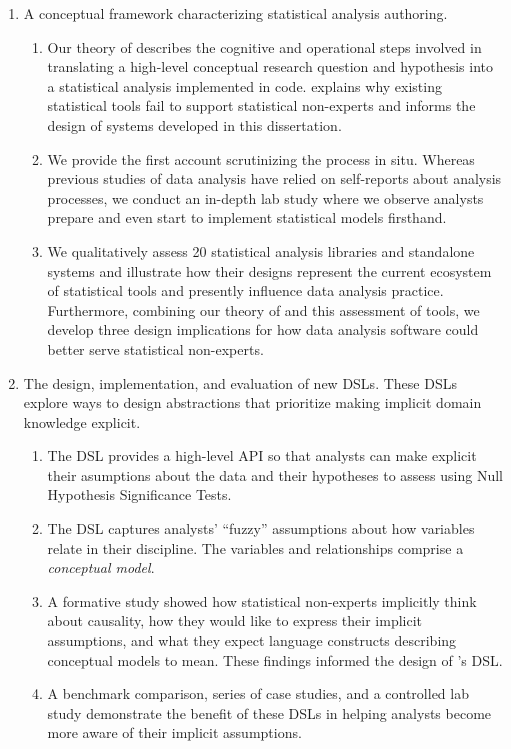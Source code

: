 \begin{enumerate} 
    \item A conceptual framework characterizing statistical analysis authoring.
    \begin{enumerate}
        \item Our theory of \hypoForm describes the cognitive and operational
        steps involved in translating a high-level conceptual research question
        and hypothesis into a statistical analysis implemented in code.
        \HypoForm explains why existing statistical
        tools fail to support statistical non-experts and informs the design
        of systems developed in this dissertation.
        \item We provide the first account scrutinizing the \hypoForm process in
        situ. Whereas previous studies of data analysis have relied on
        self-reports about analysis processes, we conduct an in-depth lab study where we
        observe analysts prepare and even start to implement statistical
        models firsthand. 
        \item We qualitatively assess 20 statistical analysis libraries and
        standalone systems and illustrate how their designs represent the
        current ecosystem of statistical tools and presently influence data
        analysis practice. Furthermore, combining our theory of \hypoForm and
        this assessment of tools, we develop three design implications for how
        data analysis software could better serve statistical non-experts. 
    \end{enumerate}

    \item The design, implementation, and evaluation of new DSLs. These DSLs
    explore ways to design abstractions that prioritize making implicit domain
    knowledge explicit. 
    \begin{enumerate}
        \item The \tea DSL provides a high-level API so that analysts can make
        explicit their asumptions about the data and their hypotheses to assess
        using Null Hypothesis Significance Tests. 
        \item The \tisane DSL captures analysts' ``fuzzy'' assumptions about how
        variables relate in their discipline. The variables and relationships
        comprise a \textit{conceptual model}.
        \item A formative study showed how statistical non-experts implicitly
        think about causality, how they would like to express their implicit
        assumptions, and what they expect language constructs describing
        conceptual models to mean. These findings informed the design of \rTisane's DSL.
        \item A benchmark comparison, series of case studies, and a controlled lab study demonstrate the benefit of
        these DSLs in helping analysts become more aware of their implicit
        assumptions. 
    \end{enumerate}


\end{enumerate}
